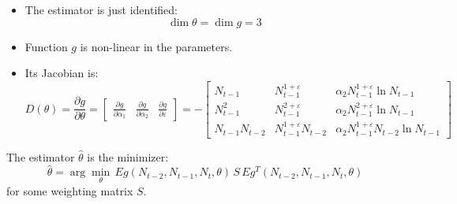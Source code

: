 \documentclass[11pt]{article}
\begin{document}
    \begin{itemize}
        \item The estimator is just identified:
        \begin{equation}
            \dim \theta = \dim g = 3
        \end{equation}
        \item Function $g$ is non-linear in the parameters.
        \item Its Jacobian is:
        \begin{equation}
            D(\theta)= \frac{\partial g}{\partial \theta} =
            \begin{bmatrix}
                \frac{\partial g}{\partial \alpha_1} & \frac{\partial g}{\partial \alpha_2} & \frac{\partial g}{\partial \varepsilon}
            \end{bmatrix} = -
            \begin{bmatrix}
                N_{t-1} & N_{t-1}^{1+\varepsilon} & \alpha_2 N_{t-1}^{1+\varepsilon} \ln N_{t-1} \\
                N_{t-1}^{2} & N_{t-1}^{2+\varepsilon} & \alpha_2 N_{t-1}^{2+\varepsilon} \ln N_{t-1}\\
                N_{t-1} N_{t-2} & N_{t-1}^{1+\varepsilon} N_{t-2} & \alpha_2 N_{t-1}^{1+\varepsilon} N_{t-2} \ln N_{t-1}
            \end{bmatrix}
        \end{equation}
    \end{itemize}
    The estimator $\hat \theta$ is the minimizer:
    \begin{equation}
        \hat \theta = \arg \min_{\theta} \, E g(N_{t-2}, N_{t-1}, N_t, \theta)  \, S \, E g^T(N_{t-2}, N_{t-1}, N_t, \theta)
    \end{equation}
    for some weighting matrix $S$.
\end{document}
